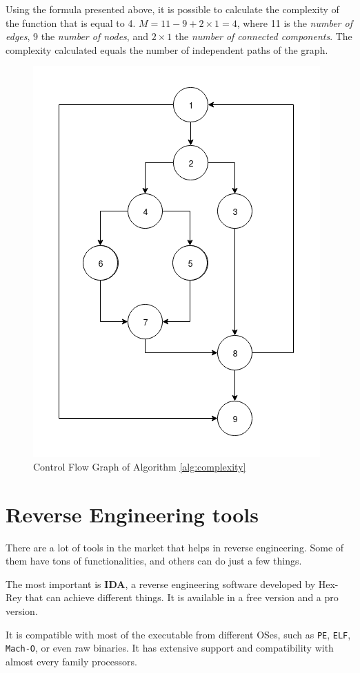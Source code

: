 	Using the formula presented above, it is possible to calculate the complexity of the function that is equal to 4. $M = 11 - 9 + 2 \times 1 = 4$, where 11 is the \textit{number of edges}, 9 the \textit{number of nodes}, and $2 \times 1$ the \textit{number of connected components}. The complexity calculated equals the number of independent paths of the graph.

\begin{figure}[!h]
	\centering
	\includegraphics[width=0.6\columnwidth]{complexity.png}
	\caption{Control Flow Graph of Algorithm \ref{alg:complexity}}
	\label{fig:complexity_ex}
\end{figure}


\section{Reverse Engineering tools}

There are a lot of tools in the market that helps in reverse engineering. Some of them have tons of functionalities, and others can do just a few things.

The most important is \textbf{IDA}, a reverse engineering software developed by Hex-Rey that can achieve different things. It is available in a free version and a pro version. 

It is compatible with most of the executable from different OSes, such as \texttt{PE}, \texttt{ELF}, \texttt{Mach-O}, or even raw binaries. It has extensive support and compatibility with almost every family processors.

